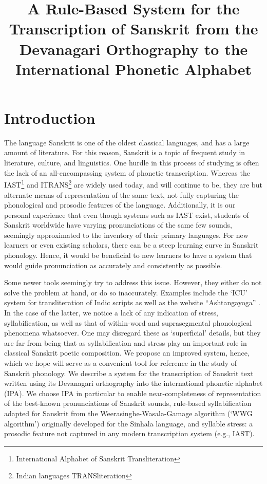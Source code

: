 \documentclass[10pt,a4paper]{article}
\title{A Rule-Based System for the Transcription of Sanskrit from the Devanagari Orthography to the International Phonetic Alphabet}
\begin{document}
\maketitleabstract

\section{Introduction}

The language Sanskrit is one of the oldest classical languages, and has a large amount of literature. For this reason, Sanskrit is a topic of frequent study in literature, culture, and linguistics. One hurdle in this process of studying is often the lack of an all-encompassing system of phonetic transcription. Whereas the IAST\footnote{International Alphabet of Sanskrit Transliteration} and ITRANS\footnote{Indian languages TRANSliteration} are widely used today, and will continue to be, they are but alternate means of representation of the same text, not fully capturing the phonological and prosodic features of the language. Additionally, it is our personal experience that even though systems such as IAST exist, students of Sanskrit worldwide have varying pronunciations of the same few sounds, seemingly approximated to the inventory of their primary languages. For new learners or even existing scholars, there can be a steep learning curve in Sanskrit phonology. Hence, it would be beneficial to new learners to have a system that would guide pronunciation as accurately and consistently as possible. 


Some newer tools seemingly try to address this issue. However, they either do not solve the problem at hand, or do so inaccurately. Examples include the `ICU' system for transliteration of Indic scripts \cite{viswanadha2002transliteration} as well as the website ``Ashtangayoga'' \cite{ashtangayoga}. In the case of the latter, we notice a lack of any indication of stress, syllabification, as well as that of within-word and suprasegmental phonological phenomena whatsoever. One may disregard these as `superficial' details, but they are far from being that as syllabification and stress play an important role in classical Sanskrit poetic composition. We propose an improved system, hence, which we hope will serve as a convenient tool for reference in the study of Sanskrit phonology. 
We describe a system for the transcription of Sanskrit text written using its Devanagari orthography into the international phonetic alphabet (IPA). We choose IPA in particular to enable near-completeness of representation of the best-known pronunciations of Sanskrit sounds, rule-based syllabification adapted for Sanskrit from the Weerasinghe-Wasala-Gamage algorithm (`WWG algorithm') originally developed for the Sinhala language, and syllable stress: a prosodic feature not captured in any modern transcription system (e.g., IAST).
\end{document}
